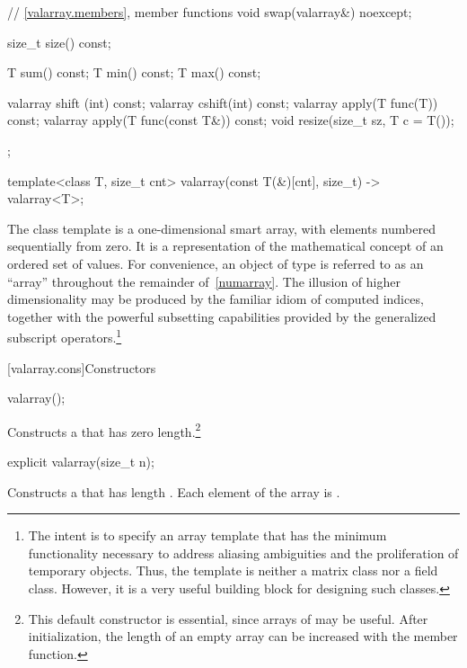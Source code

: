 \begin{codeblock}
{{    // \ref{valarray.members}, member functions
    void swap(valarray&) noexcept;

    size_t size() const;

    T sum() const;
    T min() const;
    T max() const;

    valarray shift (int) const;
    valarray cshift(int) const;
    valarray apply(T func(T)) const;
    valarray apply(T func(const T&)) const;
    void resize(size_t sz, T c = T());
  };

  template<class T, size_t cnt> valarray(const T(&)[cnt], size_t) -> valarray<T>;
}
\end{codeblock}

\pnum
The
class template
is a
one-dimensional smart array, with elements numbered sequentially from zero.
It is a representation of the mathematical concept
of an ordered set of values.
For convenience, an object of type  is referred
to as an ``array'' throughout the remainder of~\ref{numarray}.
The illusion of higher dimensionality
may be produced by the familiar idiom of computed indices, together
with the powerful subsetting capabilities provided
by the generalized subscript operators.\footnote{The intent is to specify
an array template that has the minimum functionality
necessary to address aliasing ambiguities and the proliferation of
temporary objects.
Thus, the
template is neither a
matrix class nor a field class.
However, it is a very useful building block for designing such classes.}

[valarray.cons]{Constructors}

%
\begin{itemdecl}
valarray();
\end{itemdecl}

\begin{itemdescr}
\pnum
\effects
Constructs a 
that has zero length.\footnote{This default constructor is essential,
since arrays of
may be useful.
After initialization, the length of an empty array can be increased with the
member function.}
\end{itemdescr}

%
\begin{itemdecl}
explicit valarray(size_t n);
\end{itemdecl}

\begin{itemdescr}
\pnum
\effects
Constructs a  that has length .
Each element of the array is .
\end{itemdescr}

